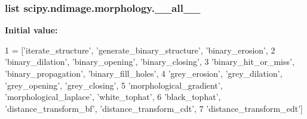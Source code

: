 \subsubsection[{\+\_\+\+\_\+all\+\_\+\+\_\+}]{\setlength{\rightskip}{0pt plus 5cm}list scipy.\+ndimage.\+morphology.\+\_\+\+\_\+all\+\_\+\+\_\+}\label{namespacescipy_1_1ndimage_1_1morphology_a51ef986225fadb5aa25aa062dba80eea}
{\bfseries Initial value\+:}
\begin{DoxyCode}
1 = [\textcolor{stringliteral}{'iterate\_structure'}, \textcolor{stringliteral}{'generate\_binary\_structure'}, \textcolor{stringliteral}{'binary\_erosion'},
2            \textcolor{stringliteral}{'binary\_dilation'}, \textcolor{stringliteral}{'binary\_opening'}, \textcolor{stringliteral}{'binary\_closing'},
3            \textcolor{stringliteral}{'binary\_hit\_or\_miss'}, \textcolor{stringliteral}{'binary\_propagation'}, \textcolor{stringliteral}{'binary\_fill\_holes'},
4            \textcolor{stringliteral}{'grey\_erosion'}, \textcolor{stringliteral}{'grey\_dilation'}, \textcolor{stringliteral}{'grey\_opening'}, \textcolor{stringliteral}{'grey\_closing'},
5            \textcolor{stringliteral}{'morphological\_gradient'}, \textcolor{stringliteral}{'morphological\_laplace'}, \textcolor{stringliteral}{'white\_tophat'},
6            \textcolor{stringliteral}{'black\_tophat'}, \textcolor{stringliteral}{'distance\_transform\_bf'}, \textcolor{stringliteral}{'distance\_transform\_cdt'},
7            \textcolor{stringliteral}{'distance\_transform\_edt'}]
\end{DoxyCode}
